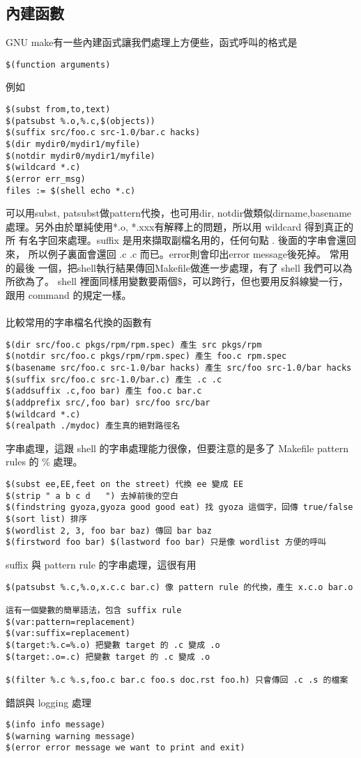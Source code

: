   \subsection{內建函數}
  GNU make有一些內建函式讓我們處理上方便些，函式呼叫的格式是
  \begin{verbatim}
$(function arguments)
  \end{verbatim}
  例如
  \begin{verbatim}
$(subst from,to,text)
$(patsubst %.o,%.c,$(objects))
$(suffix src/foo.c src-1.0/bar.c hacks)
$(dir mydir0/mydir1/myfile)
$(notdir mydir0/mydir1/myfile)
$(wildcard *.c)
$(error err_msg)
files := $(shell echo *.c)
  \end{verbatim}
  可以用subst, patsubst做pattern代換，也可用dir, notdir做類似dirname,basename
  處理。另外由於單純使用*.o, *.xxx有解釋上的問題，所以用 wildcard 得到真正的所
  有名字回來處理。suffix 是用來擷取副檔名用的，任何句點 . 後面的字串會還回來，
  所以例子裏面會還回 .c .c 而已。error則會印出error message後死掉。 常用的最後
  一個，把shell執行結果傳回Makefile做進一步處理，有了 shell 我們可以為所欲為了。
  shell 裡面同樣用變數要兩個\$，可以跨行，但也要用反斜線變一行，跟用 command
  的規定一樣。
  \\\\
  比較常用的字串檔名代換的函數有
  \begin{verbatim}
$(dir src/foo.c pkgs/rpm/rpm.spec) 產生 src pkgs/rpm
$(notdir src/foo.c pkgs/rpm/rpm.spec) 產生 foo.c rpm.spec
$(basename src/foo.c src-1.0/bar hacks) 產生 src/foo src-1.0/bar hacks
$(suffix src/foo.c src-1.0/bar.c) 產生 .c .c
$(addsuffix .c,foo bar) 產生 foo.c bar.c
$(addprefix src/,foo bar) src/foo src/bar
$(wildcard *.c)
$(realpath ./mydoc) 產生真的絕對路徑名
  \end{verbatim}
  字串處理，這跟 shell 的字串處理能力很像，但要注意的是多了 Makefile pattern
  rules 的 \% 處理。
  \begin{verbatim}
$(subst ee,EE,feet on the street) 代換 ee 變成 EE
$(strip " a b c d   ") 去掉前後的空白
$(findstring gyoza,gyoza good good eat) 找 gyoza 這個字，回傳 true/false
$(sort list) 排序
$(wordlist 2, 3, foo bar baz) 傳回 bar baz
$(firstword foo bar) $(lastword foo bar) 只是像 wordlist 方便的呼叫
  \end{verbatim}
  suffix 與 pattern rule 的字串處理，這很有用
  \begin{verbatim}
$(patsubst %.c,%.o,x.c.c bar.c) 像 pattern rule 的代換，產生 x.c.o bar.o

這有一個變數的簡單語法，包含 suffix rule
$(var:pattern=replacement)
$(var:suffix=replacement)
$(target:%.c=%.o) 把變數 target 的 .c 變成 .o
$(target:.o=.c) 把變數 target 的 .c 變成 .o

$(filter %.c %.s,foo.c bar.c foo.s doc.rst foo.h) 只會傳回 .c .s 的檔案
  \end{verbatim}
  錯誤與 logging 處理
  \begin{verbatim}
$(info info message)
$(warning warning message)
$(error error message we want to print and exit)
  \end{verbatim}
